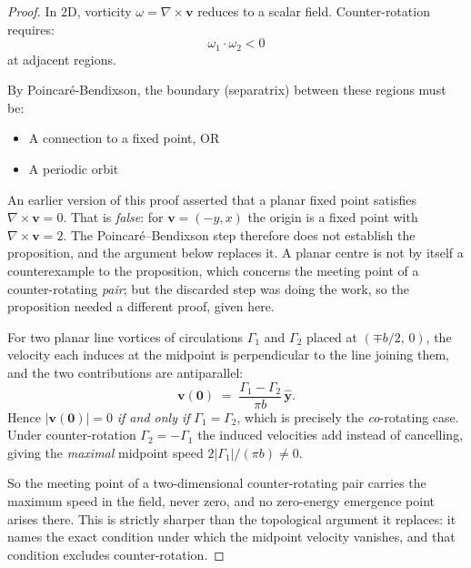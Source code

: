 \begin{proof}
In 2D, vorticity $\omega = \nabla \times \mathbf{v}$ reduces to a scalar field. Counter-rotation requires:
\begin{equation}
\omega_1 \cdot \omega_2 < 0
\end{equation}
at adjacent regions.

By Poincaré-Bendixson, the boundary (separatrix) between these regions must be:
\begin{itemize}
\item A connection to a fixed point, OR
\item A periodic orbit
\end{itemize}

\begin{remark}
An earlier version of this proof asserted that a planar fixed point satisfies
$\nabla \times \mathbf{v} = 0$. That is \emph{false}: for $\mathbf{v} = (-y, x)$
the origin is a fixed point with $\nabla \times \mathbf{v} = 2$. The
Poincar\'e--Bendixson step therefore does not establish the proposition, and the
argument below replaces it. A planar centre is not by itself a counterexample to
the proposition, which concerns the meeting point of a counter-rotating
\emph{pair}; but the discarded step was doing the work, so the proposition needed
a different proof, given here.
\end{remark}

For two planar line vortices of circulations $\Gamma_1$ and $\Gamma_2$ placed at
$(\mp b/2,\, 0)$, the velocity each induces at the midpoint is perpendicular to
the line joining them, and the two contributions are antiparallel:
\begin{equation}
\mathbf{v}(\mathbf{0}) \;=\; \frac{\Gamma_1 - \Gamma_2}{\pi b}\,\hat{\mathbf{y}} .
\label{eq:midpoint-velocity}
\end{equation}
Hence $|\mathbf{v}(\mathbf{0})| = 0$ \emph{if and only if} $\Gamma_1 = \Gamma_2$,
which is precisely the \emph{co}-rotating case. Under counter-rotation
$\Gamma_2 = -\Gamma_1$ the induced velocities add instead of cancelling, giving
the \emph{maximal} midpoint speed $2|\Gamma_1| / (\pi b) \neq 0$.

So the meeting point of a two-dimensional counter-rotating pair carries the
maximum speed in the field, never zero, and no zero-energy emergence point
arises there. This is strictly sharper than the topological argument it replaces:
it names the exact condition under which the midpoint velocity vanishes, and that
condition excludes counter-rotation.
\end{proof}

